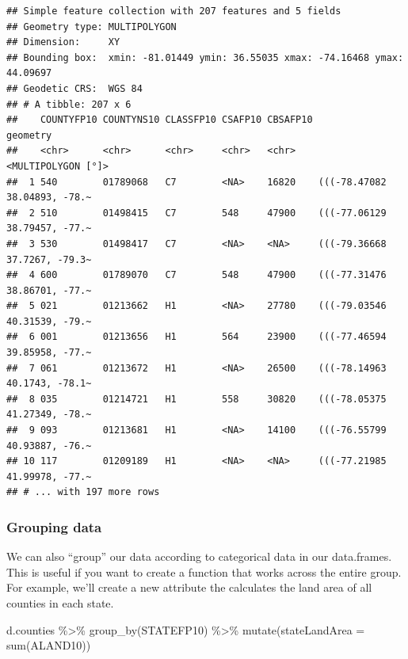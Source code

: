 \documentclass[]{article}
\newenvironment{Shaded}{\begin{snugshade}}{\end{snugshade}}
\newcommand{\AttributeTok}[1]{\textcolor[rgb]{0.77,0.63,0.00}{#1}}
\newcommand{\FunctionTok}[1]{\textcolor[rgb]{0.00,0.00,0.00}{#1}}
\newcommand{\NormalTok}[1]{#1}
\newcommand{\SpecialCharTok}[1]{\textcolor[rgb]{0.00,0.00,0.00}{#1}}
\begin{document}
\begin{verbatim}
## Simple feature collection with 207 features and 5 fields
## Geometry type: MULTIPOLYGON
## Dimension:     XY
## Bounding box:  xmin: -81.01449 ymin: 36.55035 xmax: -74.16468 ymax: 44.09697
## Geodetic CRS:  WGS 84
## # A tibble: 207 x 6
##    COUNTYFP10 COUNTYNS10 CLASSFP10 CSAFP10 CBSAFP10                     geometry
##    <chr>      <chr>      <chr>     <chr>   <chr>              <MULTIPOLYGON [°]>
##  1 540        01789068   C7        <NA>    16820    (((-78.47082 38.04893, -78.~
##  2 510        01498415   C7        548     47900    (((-77.06129 38.79457, -77.~
##  3 530        01498417   C7        <NA>    <NA>     (((-79.36668 37.7267, -79.3~
##  4 600        01789070   C7        548     47900    (((-77.31476 38.86701, -77.~
##  5 021        01213662   H1        <NA>    27780    (((-79.03546 40.31539, -79.~
##  6 001        01213656   H1        564     23900    (((-77.46594 39.85958, -77.~
##  7 061        01213672   H1        <NA>    26500    (((-78.14963 40.1743, -78.1~
##  8 035        01214721   H1        558     30820    (((-78.05375 41.27349, -78.~
##  9 093        01213681   H1        <NA>    14100    (((-76.55799 40.93887, -76.~
## 10 117        01209189   H1        <NA>    <NA>     (((-77.21985 41.99978, -77.~
## # ... with 197 more rows
\end{verbatim}

\hypertarget{grouping-data}{%
\subsubsection{Grouping data}\label{grouping-data}}

We can also ``group'' our data according to categorical data in our
data.frames. This is useful if you want to create a function that works
across the entire group. For example, we'll create a new attribute the
calculates the land area of all counties in each state.

\begin{Shaded}
\begin{Highlighting}[]
\NormalTok{d.counties }\SpecialCharTok{\%\textgreater{}\%} \FunctionTok{group\_by}\NormalTok{(STATEFP10) }\SpecialCharTok{\%\textgreater{}\%} \FunctionTok{mutate}\NormalTok{(}\AttributeTok{stateLandArea =} \FunctionTok{sum}\NormalTok{(ALAND10))}
\end{Highlighting}
\end{Shaded}
\end{document}
